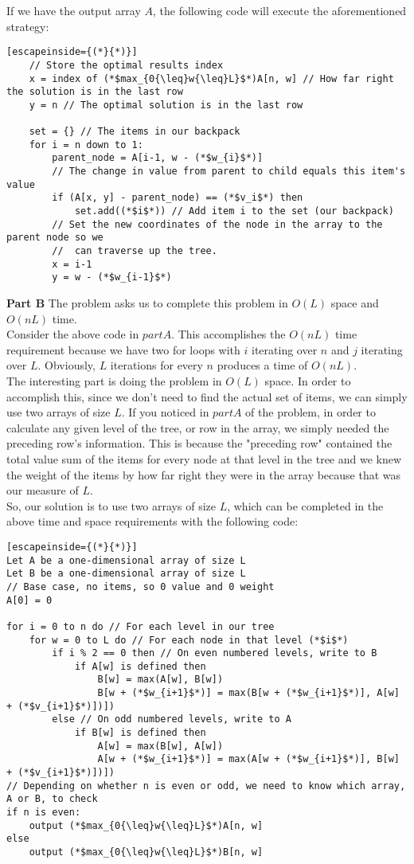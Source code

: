\documentclass{article}
\begin{document}
	If we have the output array $A$, the following code will execute the aforementioned strategy:
	
	\begin{lstlisting}[escapeinside={(*}{*)}]
	// Store the optimal results index
	x = index of (*$max_{0{\leq}w{\leq}L}$*)A[n, w] // How far right the solution is in the last row
	y = n // The optimal solution is in the last row
	
	set = {} // The items in our backpack
	for i = n down to 1:
		parent_node = A[i-1, w - (*$w_{i}$*)]
		// The change in value from parent to child equals this item's value
		if (A[x, y] - parent_node) == (*$v_i$*) then
			set.add((*$i$*)) // Add item i to the set (our backpack)
		// Set the new coordinates of the node in the array to the parent node so we
		// 	can traverse up the tree.
		x = i-1
		y = w - (*$w_{i-1}$*)
	\end{lstlisting}
	
	\textbf{Part B} The problem asks us to complete this problem in $O(L)$ space and $O(nL)$ time.\\
	
	Consider the above code in $part A$.  This accomplishes the $O(nL)$ time requirement because we have two for loops with $i$ iterating over $n$ and $j$ iterating over $L$.  Obviously, $L$ iterations for every $n$ produces a time of $O(nL)$.  \\
	
	The interesting part is doing the problem in $O(L)$ space.  In order to accomplish this, since we don't need to find the actual set of items, we can simply use two arrays of size $L$.  If you noticed in $part A$ of the problem, in order to calculate any given level of the tree, or row in the array, we simply needed the preceding row's information.  This is because the "preceding row" contained the total value sum of the items for every node at that level in the tree and we knew the weight of the items by how far right they were in the array because that was our measure of $L$.\\
	
	So, our solution is to use two arrays of size $L$, which can be completed in the above time and space requirements with the following code:
	\begin{lstlisting}[escapeinside={(*}{*)}]
Let A be a one-dimensional array of size L
Let B be a one-dimensional array of size L
// Base case, no items, so 0 value and 0 weight
A[0] = 0

for i = 0 to n do // For each level in our tree
	for w = 0 to L do // For each node in that level (*$i$*)
		if i % 2 == 0 then // On even numbered levels, write to B
			if A[w] is defined then
				B[w] = max(A[w], B[w])
				B[w + (*$w_{i+1}$*)] = max(B[w + (*$w_{i+1}$*)], A[w] + (*$v_{i+1}$*)])])
		else // On odd numbered levels, write to A
			if B[w] is defined then
				A[w] = max(B[w], A[w])
				A[w + (*$w_{i+1}$*)] = max(A[w + (*$w_{i+1}$*)], B[w] + (*$v_{i+1}$*)])])
// Depending on whether n is even or odd, we need to know which array, A or B, to check
if n is even:
	output (*$max_{0{\leq}w{\leq}L}$*)A[n, w]
else 
	output (*$max_{0{\leq}w{\leq}L}$*)B[n, w]
	\end{lstlisting}
\end{document}
